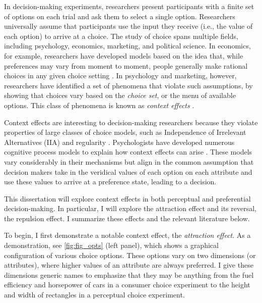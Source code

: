 In decision-making experiments, researchers present participants with a finite set of options on each trial and ask them to select a single option. Researchers universally assume that participants use the input they receive (i.e., the value of each option) to arrive at a choice. The study of choice spans multiple fields, including psychology, economics, marketing, and political science. In economics, for example, researchers have developed models based on the idea that, while preferences may vary from moment to moment, people generally make rational choices in any given choice setting \parencite{mcfadden2001economic}. In psychology and marketing, however, researchers have identified a set of phenomena that violate such assumptions, by showing that choices vary based on the \textit{choice set}, or the menu of available options. This class of phenomena is known as \textit{context effects} \parencite{adler2024forty}.

Context effects are interesting to decision-making researchers because they violate properties of large classes of choice models, such as Independence of Irrelevant Alternatives (IIA) \parencite{ray1973independence} and regularity \parencite{mcfadden2001economic}. Psychologists have developed numerous cognitive process models to explain how context effects can arise \parencite{roeMultialternativeDecisionField2001a,usherLossAversionInhibition2004a,truebloodMultiattributeLinearBallistic,wollschlager2NaryChoiceTree2012a,bergnerVAMPVotingAgent2019b,noguchiMultialternativeDecisionSampling2018a,bhatiaAssociationsAccumulationPreference2013b,tversky1993context}. These models vary considerably in their mechanisms but align in the common assumption that decision makers take in the veridical values of each option on each attribute and use these values to arrive at a preference state, leading to a decision. 

This dissertation will explore context effects in both perceptual and preferential decision-making. In particular, I will explore the attraction effect and its reversal, the repulsion effect. I summarize these effects and the relevant literature below.

To begin, I first demonstrate a notable context effect, the \textit{attraction effect}. As a demonstration, see \ref{fig:fig_opts} (left panel), which shows a graphical configuration of various choice options. These options vary on two dimensions (or attributes), where higher values of an attribute are always preferred. I give these dimensions generic names to emphasize that they may be anything from the fuel efficiency and horsepower of cars in a consumer choice experiment to the height and width of rectangles in a perceptual choice experiment.

